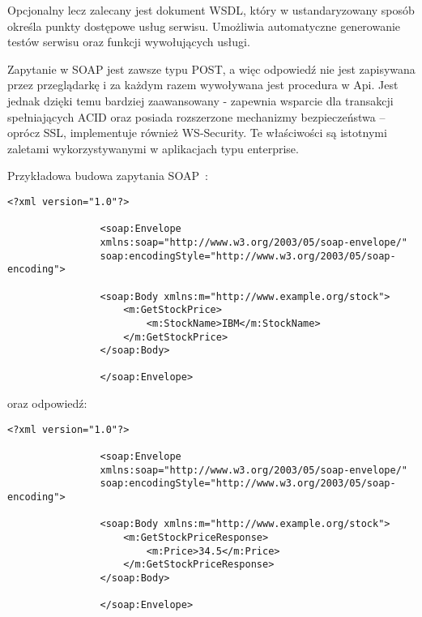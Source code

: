 \begin{description}
			Opcjonalny lecz zalecany jest dokument WSDL, który w ustandaryzowany sposób określa punkty dostępowe usług serwisu.
			Umożliwia automatyczne generowanie testów serwisu oraz funkcji wywołujących usługi.
			
			Zapytanie w SOAP jest zawsze typu POST, a więc odpowiedź nie jest zapisywana przez przeglądarkę i za każdym razem wywoływana jest procedura w Api.
			Jest jednak dzięki temu bardziej zaawansowany - zapewnia wsparcie dla transakcji spełniających ACID
			oraz posiada rozszerzone mechanizmy bezpieczeństwa -- oprócz SSL, implementuje również WS-Security.
			Te właściwości są istotnymi zaletami wykorzystywanymi w aplikacjach typu enterprise.

			Przykładowa budowa zapytania SOAP~\cite{SoapMsg}:

			\begin{lstlisting}[label=lst:soapReq, xleftmargin=0.5cm]
				<?xml version="1.0"?>

				<soap:Envelope
				xmlns:soap="http://www.w3.org/2003/05/soap-envelope/"
				soap:encodingStyle="http://www.w3.org/2003/05/soap-encoding">

				<soap:Body xmlns:m="http://www.example.org/stock">
					<m:GetStockPrice>
						<m:StockName>IBM</m:StockName>
					</m:GetStockPrice>
				</soap:Body>

				</soap:Envelope>
			\end{lstlisting}

			oraz odpowiedź:
			\begin{lstlisting}[label=lst:soapRes, xleftmargin=0.5cm]
				<?xml version="1.0"?>

				<soap:Envelope
				xmlns:soap="http://www.w3.org/2003/05/soap-envelope/"
				soap:encodingStyle="http://www.w3.org/2003/05/soap-encoding">

				<soap:Body xmlns:m="http://www.example.org/stock">
					<m:GetStockPriceResponse>
						<m:Price>34.5</m:Price>
					</m:GetStockPriceResponse>
				</soap:Body>

				</soap:Envelope>
			\end{lstlisting}
			

\end{description}
